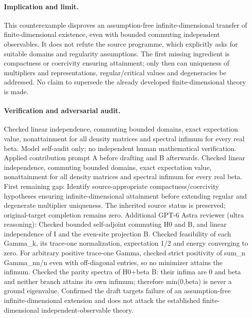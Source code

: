 \documentclass[11pt]{article}
\begin{document}
\paragraph{Implication and limit.} This counterexample disproves an assumption-free infinite-dimensional transfer of finite-dimensional existence, even with bounded commuting independent observables. It does not refute the source programme, which explicitly asks for suitable domains and regularity assumptions. The first missing ingredient is compactness or coercivity ensuring attainment; only then can uniqueness of multipliers and representations, regular/critical values and degeneracies be addressed. No claim to supersede the already developed finite-dimensional theory is made.

\paragraph{Verification and adversarial audit.}
Checked linear independence, commuting bounded domains, exact expectation value, nonattainment for all density matrices and spectral infimum for every real beta. Model self-audit only; no independent human mathematical verification. Applied contribution prompt A before drafting and B afterwards. Checked linear independence, commuting bounded domains, exact expectation value, nonattainment for all density matrices and spectral infimum for every real beta. First remaining gap: Identify source-appropriate compactness/coercivity hypotheses ensuring infinite-dimensional attainment before extending regular and degenerate multiplier uniqueness. The inherited source status is preserved; original-target completion remains zero. Additional GPT-6 Astra reviewer (ultra reasoning): Checked bounded self-adjoint commuting H0 and B, and linear independence of I and the even-site projection B. Checked feasibility of each Gamma\_k, its trace-one normalization, expectation 1/2 and energy converging to zero. For arbitrary positive trace-one Gamma, checked strict positivity of sum\_n Gamma\_nn/n even with off-diagonal entries, so no minimizer attains the infimum. Checked the parity spectra of H0+beta B: their infima are 0 and beta and neither branch attains its own infimum; therefore min(0,beta) is never a ground eigenvalue. Confirmed the draft targets failure of an assumption-free infinite-dimensional extension and does not attack the established finite-dimensional independent-observable theory.
\end{document}
